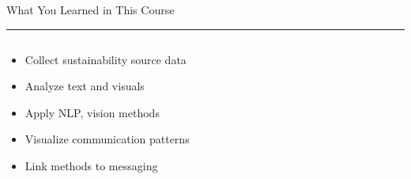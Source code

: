 \documentclass[aspectratio=169]{beamer}
\newcommand{\TitleFont}{\rmfamily}
\begin{document}
\begin{frame}[t]{}
  \vspace*{0.5cm}
  {\TitleFont\fontsize{18}{22}\selectfont\color{LUBronze}What You Learned in This Course\par}
  \vspace{0.3em}
  {\color{LUBronze}\rule{\linewidth}{0.8pt}}\par
  \vspace{0.2cm}
  \begin{columns}[t]
    \begin{column}[t]{0.4\textwidth}
      \vspace*{0pt}
      \begin{itemize}\setlength\itemsep{0.65em}
        \item Collect sustainability source data
        \item Analyze text and visuals
        \item Apply NLP, vision methods
        \item Visualize communication patterns
        \item Link methods to messaging
      \end{itemize}
    \end{column}
  \end{columns}
\end{frame}
\end{document}
